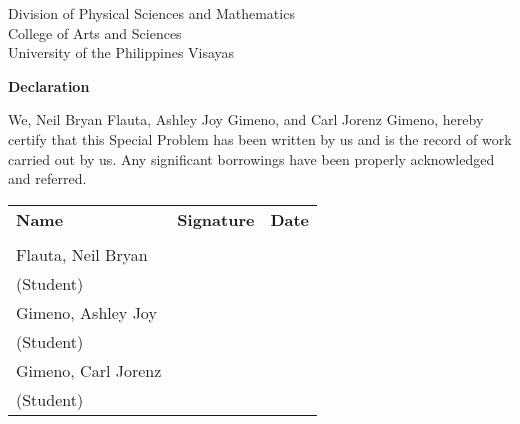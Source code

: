 \begin{center}
	Division of Physical Sciences and Mathematics\\
	College of Arts and Sciences\\
	University of the Philippines Visayas 
	
		\textbf{Declaration}
		\end{center}

We,  Neil Bryan Flauta, Ashley Joy Gimeno, and Carl Jorenz Gimeno, hereby certify that this Special Problem has been written by us  and is the record of work carried out by us. Any significant borrowings have been properly acknowledged and referred.

	\begin{tabular}{lll}
	\bfseries Name  & \bfseries Signature & \bfseries Date\\ \\
	Flauta, Neil Bryan &\signaturerule  & \signaturerule\\ 
	\multicolumn{1}{l}{(Student)} \\ 
	Gimeno, Ashley Joy &\signaturerule  & \signaturerule\\ 
	\multicolumn{1}{l}{(Student)} \\
	Gimeno, Carl Jorenz &\signaturerule  & \signaturerule\\ 
\multicolumn{1}{l}{(Student)} \\

\end{tabular}



